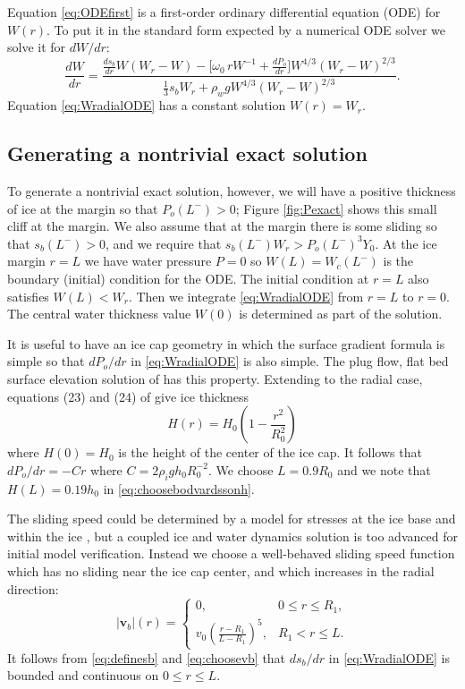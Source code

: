 \documentclass[11pt,final]{amsart}
\newcommand\bv{\mathbf{v}}
\begin{document}
Equation \eqref{eq:ODEfirst} is a first-order ordinary differential equation (ODE) for $W(r)$.  To put it in the standard form expected by a numerical ODE solver we solve it for $dW/dr$:
\begin{equation}
\frac{dW}{dr} = \frac{\frac{ds_b}{dr} W (W_r - W) - \Big[\omega_0\, r W^{-1} + \frac{dP_o}{dr}\Big] W^{4/3} \left(W_r - W\right)^{2/3}}{\frac{1}{3} s_b W_r + \rho_w g W^{4/3} (W_r - W)^{2/3}}.
\label{eq:WradialODE}
\end{equation}
Equation \eqref{eq:WradialODE} has a constant solution $W(r)=W_r$.

\subsection*{Generating a nontrivial exact solution}  To generate a nontrivial exact solution, however, we will have a positive thickness of ice at the margin so that $P_o(L^-)>0$; Figure \ref{fig:Pexact} shows this small cliff at the margin.  We also assume that at the margin there is some sliding so that $s_b(L^-)>0$, and we require that $s_b(L^-) W_r > P_o(L^-)^3 Y_0$.  At the ice margin $r=L$ we have water pressure $P=0$ so $W(L)=W_c(L^-)$ is the boundary (initial) condition for the ODE.  The initial condition at $r=L$ also satisfies $W(L) < W_r$.  Then we integrate \eqref{eq:WradialODE} from $r=L$ to $r=0$.  The central water thickness value $W(0)$ is determined as part of the solution.

It is useful to have an ice cap geometry in which the surface gradient formula is simple so that $dP_o/dr$ in \eqref{eq:WradialODE} is also simple.  The plug flow, flat bed surface elevation solution of \cite{Bodvardsson} has this property.  Extending to the radial case, equations (23) and (24) of \citep{Bodvardsson} give ice thickness
\begin{equation}
H(r) = H_0 \left(1 - \frac{r^2}{R_0^2} \right) \label{eq:choosebodvardssonh}
\end{equation}
where $H(0)=H_0$ is the height of the center of the ice cap.  It follows that $dP_o/dr = - C r$ where $C=2\rho_i g h_0 R_0^{-2}$.  We choose $L=0.9 R_0$ and we note that $H(L)=0.19 h_0$ in \eqref{eq:choosebodvardssonh}.

The sliding speed could be determined by a model for stresses at the ice base and within the ice \citep{GreveBlatter2009}, but a coupled ice and water dynamics solution is too advanced for initial model verification.  Instead we choose a well-behaved sliding speed function which has no sliding near the ice cap center, and which increases in the radial direction:
\begin{equation}
|\bv_b|(r) = \begin{cases} 0, & 0 \le r \le R_1, \\
                           v_0  \left(\frac{r-R_1}{L-R_1}\right)^5, & R_1 < r \le L.
             \end{cases}  \label{eq:choosevb}
\end{equation}
It follows from \eqref{eq:definesb} and \eqref{eq:choosevb} that $ds_b/dr$ in \eqref{eq:WradialODE} is bounded and continuous on $0\le r \le L$.
\end{document}
